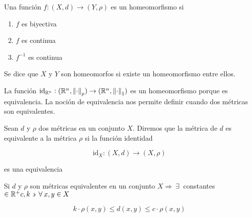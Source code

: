 \begin{definition}[Homeomorfismo]

   Una función $f: (X,d) \to (Y,\rho)$ es un homeomorfismo si

   \begin{enumerate}
       \item $f$ es biyectiva
       \item $f$ es continua
       \item ${f}^{-1}$ es continua
   \end{enumerate}

   Se dice que $X$ y $Y$ son homeomorfos si existe un homeomorfismo entre ellos.
\end{definition}

\begin{remark}
       La función ${\mathrm{id}}_{\mathbb{R}^n} : (\mathbb{R}^n, {\norm{\cdot}}_{p}) \to (\mathbb{R}^n, {\norm{\cdot}}_{1})$ es un homeomorfismo porque es equivalencia. La noción de equivalencia nos permite definir cuando dos métricas son equivalentes.
\end{remark}

\begin{definition}
    Sean $d$ y $\rho$ dos métricas en un conjunto $X$. Diremos que la métrica de $d$ es equivalente a la métrica $\rho$ si la función identidad

    \begin{equation*}
        {\mathrm{id}}_{X} : (X, d) \to (X, \rho)
    \end{equation*}

    es una equivalencia
\end{definition}

\begin{remark}
    Si $d$ y $\rho$ son métricas equivalentes en un conjunto $X  \Rightarrow \: \exists \:$ constantes $\in \mathbb{R}^+ c, k \backepsilon \: \forall \: x, y \in X$

    \begin{equation*}
        k \cdot \rho(x,y) \leqslant d(x,y) \leqslant c \cdot \rho(x,y)
    \end{equation*}
\end{remark}

